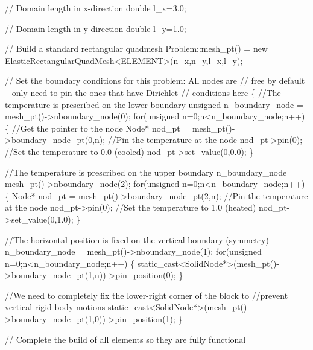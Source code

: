 \begin{DoxyCodeInclude}
 \textcolor{comment}{// Domain length in x-direction}
 \textcolor{keywordtype}{double} l\_x=3.0;

 \textcolor{comment}{// Domain length in y-direction}
 \textcolor{keywordtype}{double} l\_y=1.0;

 \textcolor{comment}{// Build a standard rectangular quadmesh}
 Problem::mesh\_pt() = 
  \textcolor{keyword}{new} ElasticRectangularQuadMesh<ELEMENT>(n\_x,n\_y,l\_x,l\_y);

 \textcolor{comment}{// Set the boundary conditions for this problem: All nodes are}
 \textcolor{comment}{// free by default -- only need to pin the ones that have Dirichlet }
 \textcolor{comment}{// conditions here}
 \{
  \textcolor{comment}{//The temperature is prescribed on the lower boundary}
  \textcolor{keywordtype}{unsigned} n\_boundary\_node = mesh\_pt()->nboundary\_node(0);
  \textcolor{keywordflow}{for}(\textcolor{keywordtype}{unsigned} n=0;n<n\_boundary\_node;n++)
   \{
    \textcolor{comment}{//Get the pointer to the node}
    Node* nod\_pt = mesh\_pt()->boundary\_node\_pt(0,n);
    \textcolor{comment}{//Pin the temperature at the node }
    nod\_pt->pin(0);
    \textcolor{comment}{//Set the temperature to 0.0 (cooled)}
    nod\_pt->set\_value(0,0.0);
   \}
  
  \textcolor{comment}{//The temperature is prescribed on the upper boundary}
  n\_boundary\_node = mesh\_pt()->nboundary\_node(2);
  \textcolor{keywordflow}{for}(\textcolor{keywordtype}{unsigned} n=0;n<n\_boundary\_node;n++)
   \{
    Node* nod\_pt = mesh\_pt()->boundary\_node\_pt(2,n);
    \textcolor{comment}{//Pin the temperature at the node}
    nod\_pt->pin(0);
    \textcolor{comment}{//Set the temperature to 1.0 (heated)}
    nod\_pt->set\_value(0,1.0);
   \}
  
  \textcolor{comment}{//The horizontal-position is fixed on the vertical boundary (symmetry)}
  n\_boundary\_node = mesh\_pt()->nboundary\_node(1);
  \textcolor{keywordflow}{for}(\textcolor{keywordtype}{unsigned} n=0;n<n\_boundary\_node;n++)
   \{
    \textcolor{keyword}{static\_cast<}SolidNode*\textcolor{keyword}{>}(mesh\_pt()->boundary\_node\_pt(1,n))->pin\_position(0);
   \}
  
  \textcolor{comment}{//We need to completely fix the lower-right corner of the block to }
  \textcolor{comment}{//prevent vertical rigid-body motions}
  \textcolor{keyword}{static\_cast<}SolidNode*\textcolor{keyword}{>}(mesh\_pt()->boundary\_node\_pt(1,0))->pin\_position(1);
 \}

 \textcolor{comment}{// Complete the build of all elements so they are fully functional }


\end{DoxyCodeInclude}
